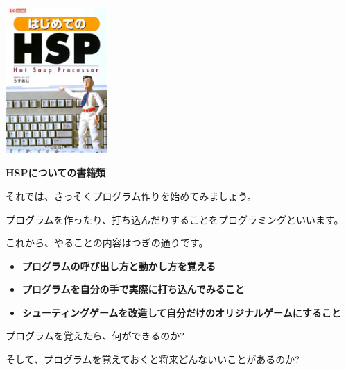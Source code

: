 \documentclass[a4paper,dvipdfmx]{jarticle}
\newcommand\textstyleqwerty[1]{#1}
\begin{document}
\begin{center}
\includegraphics[width=3.889cm,height=5.629cm]{text02-img/text02-img008.jpg}

\end{center}

\bigskip


\bigskip


\bigskip


\bigskip


\bigskip


\bigskip


\bigskip


\bigskip

\textstyleqwerty{\textbf{HSPについての書籍類}}


\bigskip


\bigskip


\bigskip


\bigskip


\bigskip

それでは、さっそくプログラム作りを始めてみましょう。

プログラムを作ったり、打ち込んだりすることをプログラミングといいます。

これから、やることの内容はつぎの通りです。


\bigskip

\begin{itemize}
\item {\bfseries
プログラムの呼び出し方と動かし方を覚える}
\item {\bfseries
プログラムを自分の手で実際に打ち込んでみること}
\item {\bfseries
シューティングゲームを改造して自分だけのオリジナルゲームにすること}
\end{itemize}

\bigskip

プログラムを覚えたら、何ができるのか?

そして、プログラムを覚えておくと将来どんないいことがあるのか?
\end{document}
